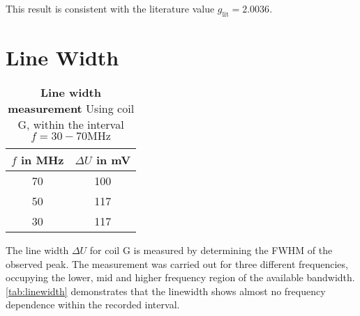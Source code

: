 This result is consistent with the literature value $g_\text{lit}%
=\num{2.0036}$\cite{g-factor}.

\section{Line Width}
\begin{table}[tbp]
	\centering
	\caption[Line width]{\textbf{Line width measurement} Using coil G, within the interval $f=30-70\si{\MHz}$}
	\label{tab:linewidth}
	\begin{tabular}{SS}
		\toprule
		{$f$ in \si{\MHz}}	&	{$\Delta U$ in \si{\mV}}	\\
			&	100	\\
		50	&	117	\\
		30	&	117	\\
		\bottomrule
	\end{tabular}
\end{table}
The line width $\Delta U$ for coil G is measured by determining the FWHM of the observed peak.
The measurement was carried out for three different frequencies, occupying the lower, mid and higher frequency region of the available bandwidth.
\autoref{tab:linewidth} demonstrates that the linewidth shows almost no frequency dependence within the recorded interval.
